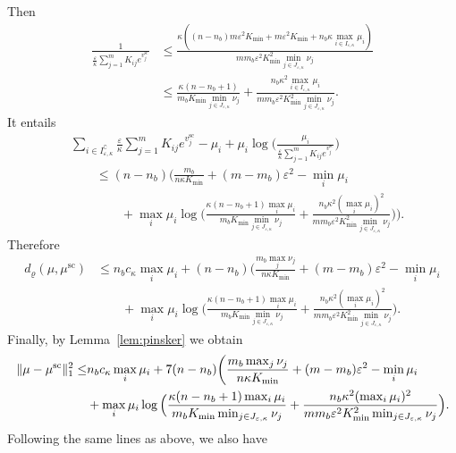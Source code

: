 Then 
\begin{align*}
\frac{1}{\frac \varepsilon\kappa\sum_{j=1}^m K_{ij} e^{v^{\text{sc}}_j}} &\leq \frac{\kappa((n-n_b)m\varepsilon^2K_{\min}+ m\varepsilon^2K_{\min} + n_b\kappa\max_{i\in I_{\varepsilon,\kappa}}\mu_i)}{mm_b\varepsilon^2 K_{\min}^2\min_{j \in J_{\varepsilon,\kappa}}\nu_j}\\
&\leq \frac{\kappa(n-n_b+ 1)}{m_bK_{\min}\min_{j \in J_{\varepsilon,\kappa}}\nu_j} + \frac{n_b\kappa^2\max_{i\in I_{\varepsilon,\kappa}}\mu_i}{mm_b\varepsilon^2K_{\min}^2\min_{j \in J_{\varepsilon,\kappa}}\nu_j}.
\end{align*}
It entails 
\begin{align*}
&\sum_{i\in I^\complement_{\varepsilon,\kappa}}\frac \varepsilon\kappa\sum_{j=1}^m K_{ij} e^{v^{\text{sc}}_j} - \mu_i + \mu_i \log\Big(\frac{\mu_i}{\frac \varepsilon\kappa\sum_{j=1}^m K_{ij} e^{v^{\text{sc}}_j}}\Big)\\
&\qquad \leq (n-n_b)\bigg(\frac{m_b}{n\kappa K_{\min}} + (m- m_b) \varepsilon^2 - \min_{i}\mu_i\\
&\qquad \qquad + \max_{i}\mu_i\log\Big(\frac{\kappa(n-n_b+ 1)\max_{i}\mu_i}{m_bK_{\min}\min_{j \in J_{\varepsilon,\kappa}}\nu_j} + \frac{n_b\kappa^2(\max_{i}\mu_i)^2}{mm_b\varepsilon^2 K_{\min}^2\min_{j \in J_{\varepsilon,\kappa}}\nu_j}\Big)
\bigg).
\end{align*}
Therefore
\begin{align*}
d_\varrho({\mu},{\mu}^{\text{sc}}) &\leq n_b c_{\kappa}\max_{i} \mu_i + (n-n_b)\bigg(\frac{m_b\max_{j}\nu_j}{n\kappa K_{\min}} + (m- m_b) \varepsilon^2 - \min_{i}\mu_i\\
&\qquad + \max_{i} \mu_i\log\Big(\frac{\kappa(n-n_b+ 1)\max_{i} \mu_i}{m_bK_{\min}\min_{j \in J_{\varepsilon,\kappa}}\nu_j} + \frac{n_b\kappa^2(\max_{i} \mu_i)^2}{mm_b\varepsilon^2 K_{\min}^2\min_{j \in J_{\varepsilon,\kappa}}\nu_j}\Big).
\end{align*}
Finally, by Lemma~\ref{lem:pinsker} we obtain
\begin{align*}
\|{\mu} -{\mu}^{\text{sc}}\|^2_1 \leq & n_bc_{\kappa}\max_{i} \mu_i + 7(n-n_b)\bigg(\frac{m_b\max_{j}\nu_j}{n\kappa K_{\min}} + (m- m_b) \varepsilon^2 - \min_{i}\mu_i\\
&+ \max_{i} \mu_i\log\Big(\frac{\kappa(n-n_b+ 1)\max_{i} \mu_i}{m_bK_{\min}\min_{j \in J_{\varepsilon,\kappa}}\nu_j} + \frac{n_b\kappa^2(\max_{i} \mu_i)^2}{mm_b\varepsilon^2K_{\min}^2\min_{j \in J_{\varepsilon,\kappa}}\nu_j}\Big).
\end{align*}
Following the same lines as above, we also have
